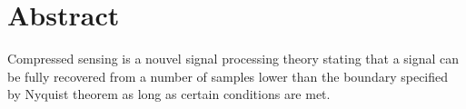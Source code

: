 

\cleardoublepage
\chapter*{Abstract}
\justify
Compressed sensing is a nouvel signal processing theory stating that a signal can be fully recovered from a number of samples lower than the boundary specified by Nyquist theorem as long as certain conditions are met.  
\vskip0.5cm








